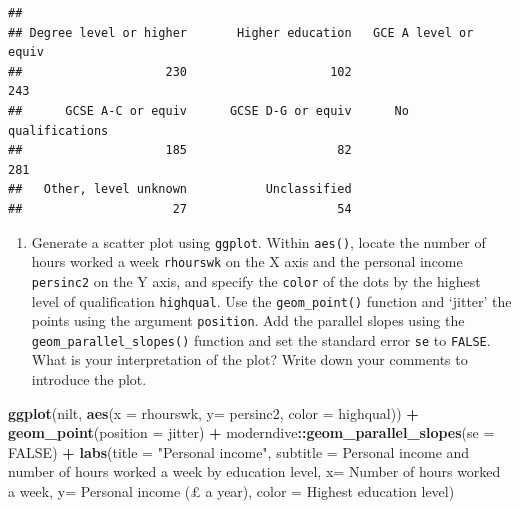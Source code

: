 \documentclass[
]{book}
\newenvironment{Shaded}{\begin{snugshade}}{\end{snugshade}}
\newcommand{\AttributeTok}[1]{\textcolor[rgb]{0.13,0.29,0.53}{#1}}
\newcommand{\ConstantTok}[1]{\textcolor[rgb]{0.56,0.35,0.01}{#1}}
\newcommand{\FunctionTok}[1]{\textcolor[rgb]{0.13,0.29,0.53}{\textbf{#1}}}
\newcommand{\NormalTok}[1]{#1}
\newcommand{\SpecialCharTok}[1]{\textcolor[rgb]{0.81,0.36,0.00}{\textbf{#1}}}
\newcommand{\StringTok}[1]{\textcolor[rgb]{0.31,0.60,0.02}{#1}}
\providecommand{\tightlist}{%
  \setlength{\itemsep}{0pt}\setlength{\parskip}{0pt}}
\begin{document}
\begin{Shaded}
\end{Shaded}

\begin{verbatim}
## 
## Degree level or higher       Higher education   GCE A level or equiv 
##                    230                    102                    243 
##      GCSE A-C or equiv      GCSE D-G or equiv      No qualifications 
##                    185                     82                    281 
##   Other, level unknown           Unclassified 
##                     27                     54
\end{verbatim}

\begin{enumerate}
\def\labelenumi{\arabic{enumi}.}
\setcounter{enumi}{2}
\tightlist
\item
  Generate a scatter plot using \texttt{ggplot}. Within \texttt{aes()}, locate the number of hours worked a week \texttt{rhourswk} on the X axis and the personal income \texttt{persinc2} on the Y axis, and specify the \texttt{color} of the dots by the highest level of qualification \texttt{highqual}. Use the \texttt{geom\_point()} function and `jitter' the points using the argument \texttt{position}. Add the parallel slopes using the \texttt{geom\_parallel\_slopes()} function and set the standard error \texttt{se} to \texttt{FALSE}. What is your interpretation of the plot? Write down your comments to introduce the plot.
\end{enumerate}

\begin{Shaded}
\begin{Highlighting}[]
\FunctionTok{ggplot}\NormalTok{(nilt, }\FunctionTok{aes}\NormalTok{(}\AttributeTok{x =}\NormalTok{ rhourswk, }\AttributeTok{y=}\NormalTok{ persinc2, }\AttributeTok{color =}\NormalTok{ highqual)) }\SpecialCharTok{+}
  \FunctionTok{geom\_point}\NormalTok{(}\AttributeTok{position =} \StringTok{\textquotesingle{}jitter\textquotesingle{}}\NormalTok{) }\SpecialCharTok{+}
\NormalTok{  moderndive}\SpecialCharTok{::}\FunctionTok{geom\_parallel\_slopes}\NormalTok{(}\AttributeTok{se =} \ConstantTok{FALSE}\NormalTok{) }\SpecialCharTok{+}
  \FunctionTok{labs}\NormalTok{(}\AttributeTok{title =} \StringTok{"Personal income"}\NormalTok{,}
       \AttributeTok{subtitle =} \StringTok{\textquotesingle{}Personal income and number of hours worked a week by education level\textquotesingle{}}\NormalTok{,}
       \AttributeTok{x=} \StringTok{\textquotesingle{}Number of hours worked a week\textquotesingle{}}\NormalTok{, }\AttributeTok{y=} \StringTok{\textquotesingle{}Personal income (£ a year)\textquotesingle{}}\NormalTok{, }
       \AttributeTok{color =} \StringTok{\textquotesingle{}Highest education level\textquotesingle{}}\NormalTok{)}
\end{Highlighting}
\end{Shaded}
\end{document}
